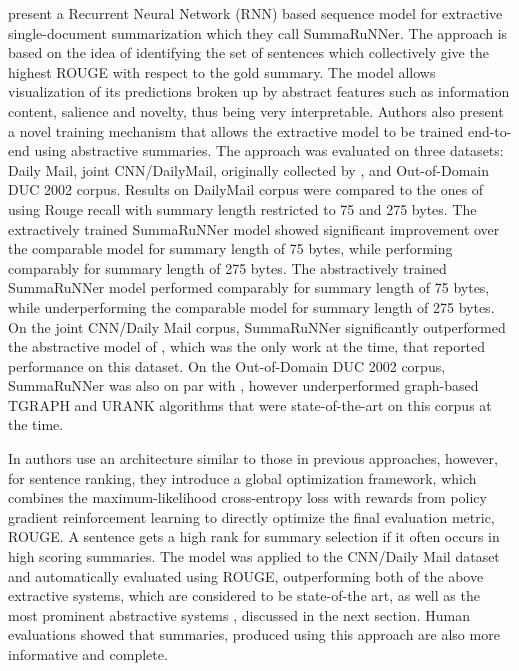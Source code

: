 \documentclass[11pt,a4paper,onecolumn]{article}
\begin{document}
 present a Recurrent Neural Network (RNN) based sequence model for extractive single-document summarization  which they call SummaRuNNer.
The approach is based on the idea of identifying the set of sentences which collectively give the highest ROUGE with respect to the gold summary.
The model allows visualization of its predictions broken up by abstract features such as information content, salience and novelty, thus being very interpretable.
Authors also present a novel training mechanism that allows the extractive model to be trained end-to-end using abstractive summaries.
The approach was evaluated on three datasets: Daily Mail, joint CNN/DailyMail, originally collected by , and Out-of-Domain DUC 2002 corpus.
Results on DailyMail corpus were compared to the ones of \cite{cheng2016neural} using Rouge recall with summary length restricted to 75 and 275 bytes.
The extractively trained SummaRuNNer model showed significant improvement over the comparable model for summary length of 75 bytes, while performing comparably for summary length of 275 bytes.
The abstractively trained SummaRuNNer model performed comparably for summary length of 75 bytes, while underperforming the comparable model for summary length of 275 bytes.
On the joint CNN/Daily Mail corpus, SummaRuNNer significantly outperformed the abstractive model of , which was the only work at the time, that reported performance on this dataset.
On the Out-of-Domain DUC 2002 corpus, SummaRuNNer was also on par with \cite{cheng2016neural}, however underperformed graph-based TGRAPH \cite{parveen2015topical} and URANK \cite{wan2010towards} algorithms that were state-of-the-art on this corpus at the time.

In \cite{narayan2017neural} authors use an architecture similar to those in previous approaches, however, for sentence ranking, they introduce a global optimization framework, which combines the maximum-likelihood cross-entropy loss with rewards from policy gradient reinforcement learning to directly optimize the final evaluation metric, ROUGE.
A sentence gets a high rank for summary selection if it often occurs in high scoring summaries.
The model was applied to the CNN/Daily Mail dataset and automatically evaluated using ROUGE, outperforming both of the above extractive systems, which are considered to be state-of-the art, as well as the most prominent abstractive systems \cite{nallapati2016abstractive, chen2016distraction, see2017get}, discussed in the next section.
Human evaluations showed that summaries, produced using this approach are also more informative and complete.
\end{document}
